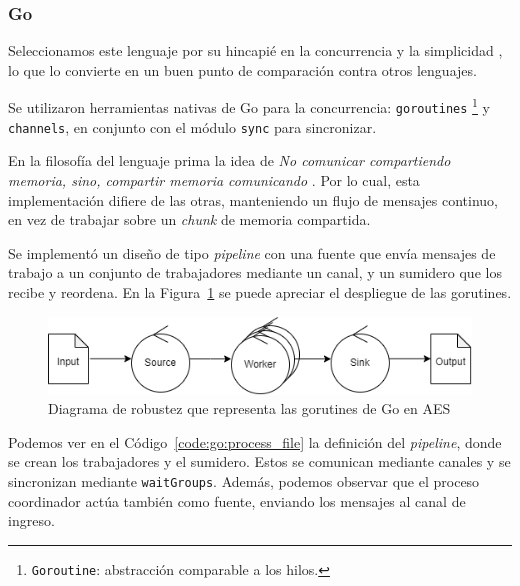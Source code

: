 \documentclass[11pt]{article}
\let\Oldsubsubsection\subsubsection
\renewcommand{\subsubsection}{\FloatBarrier\Oldsubsubsection}
\newcommand{\english}[1]{\textit{#1}}
\newcommand{\technical}[1]{\textit{#1}}
\begin{document}
\subsubsection{Go}

Seleccionamos este lenguaje por su hincapié en la concurrencia \cite{go:ex:concurrency_patterns} y la simplicidad \cite{go:ex:simple}, lo que lo convierte en un buen punto de comparación contra otros lenguajes.

Se utilizaron herramientas nativas de Go para la concurrencia: \lstinline{goroutines} \footnote{ \lstinline{Goroutine}: abstracción comparable a los hilos.} y \lstinline{channels}, en conjunto con el módulo \lstinline{sync} para sincronizar.

En la filosofía del lenguaje prima la idea de \technical{No comunicar compartiendo memoria, sino, compartir memoria comunicando} \cite{go:ex:sharing}. Por lo cual, esta implementación difiere de las otras, manteniendo un flujo de mensajes continuo, en vez de trabajar sobre un \english{chunk} de memoria compartida.

Se implementó un diseño de tipo \english{pipeline} con una fuente que envía mensajes de trabajo a un conjunto de trabajadores mediante un canal, y un sumidero que los recibe y reordena. En la Figura~\ref{fig:go:robustness} se puede apreciar el despliegue de las gorutines.

\begin{figure}[h]
    \centering
    \includegraphics[scale=0.7]{resources/aes/go_robustness.png}
    \caption{Diagrama de robustez que representa las gorutines de Go en AES}
    \label{fig:go:robustness}
\end{figure}

Podemos ver en el Código~\ref{code:go:process_file} la definición del \english{pipeline}, donde se crean los trabajadores y el sumidero. Estos se comunican mediante canales y se sincronizan mediante \lstinline{waitGroups}. Además, podemos observar que el proceso coordinador actúa también como fuente, enviando los mensajes al canal de ingreso.
\end{document}
